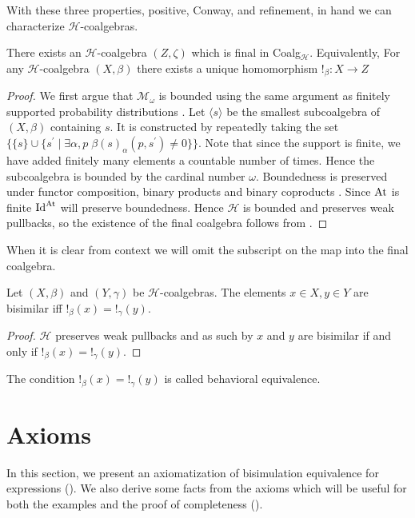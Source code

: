 \documentclass[a4paper,UKenglish,cleveref, autoref, thm-restate]{lipics-v2021}
\newcommand{\Id}{\text{\upshape{Id}}}
\newcommand{\At}{\text{\upshape{At}}}
\newcommand{\Mon}{\mathcal{M}_\omega}
\newcommand{\wgkat}{\textsf{\upshape{wGKAT}}\xspace}
\theoremstyle{plain}\newtheoremrep{thm}{Theorem}[section]
\begin{document}
	\begin{toappendix}
		With these three properties, positive, Conway, and refinement, in hand we can characterize $\mathcal H$-coalgebras.
		
		\begin{prop}
			There exists an $\mathcal{H}$-coalgebra $(Z, \zeta)$ which is final in Coalg$_{\mathcal{H}}$. Equivalently, For any $\mathcal{H}$-coalgebra $(X, \beta)$ there exists a unique homomorphism $!_{\beta}:X\to Z$ 
		\end{prop}
		\begin{proof}
			We first argue that $\Mon$ is bounded using the same argument as finitely supported probability distributions \cite{DEVINK}. Let $\langle s \rangle$ be the smallest subcoalgebra of $(X, \beta)$ containing $s$. It is constructed by repeatedly taking the set $\{\{s\} \cup \{s^\prime \mid \exists \alpha, p \; \beta(s)_\alpha(p, s^\prime) \neq 0 \}\}$. Note that since the support is finite, we have added finitely many elements a countable number of times. Hence the subcoalgebra is bounded by the cardinal number $\omega$. Boundedness is preserved under functor composition, binary products and binary coproducts \cite[Corollary 4.9]{gumm2002coalgebras}. Since $\At$ is finite $\Id^{\At}$ will preserve boundedness. Hence $\mathcal{H}$ is bounded and preserves weak pullbacks, so the existence of the final coalgebra follows from \cite[Theorem 10.3]{Rutten2000UniversalCA}.
		\end{proof}
		When it is clear from context we will omit the subscript on the map into the final coalgebra.
		\begin{prop}
			Let $(X, \beta)$ and $(Y, \gamma)$ be $\mathcal{H}$-coalgebras. The elements $x \in X, y \in Y$ are bisimilar iff $!_\beta(x) = !_\gamma(y)$. \label{bisimIffBeh}
		\end{prop}
		\begin{proof}
			$\mathcal{H}$ preserves weak pullbacks and as such by \cite[Theorem 9.3]{Rutten2000UniversalCA} $x$ and $y$ are bisimilar if and only if $!_\beta(x) = !_\gamma(y)$.
		\end{proof}
		The condition $!_\beta(x) = !_\gamma(y)$ is called behavioral equivalence.
	\end{toappendix} 
	
	\section{Axioms}\label{axiomsS}
	In this section, we present an axiomatization of bisimulation equivalence for \wgkat expressions (). We also derive some facts from the axioms which will be useful for both the examples and the proof of completeness (). 
	
\end{document}
